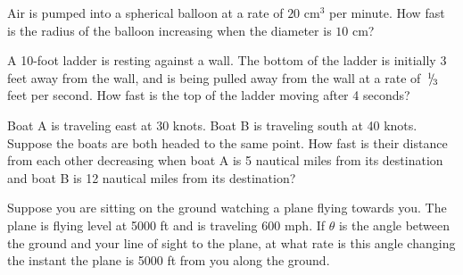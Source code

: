 \documentclass[unboxed]{hwset}
\date{29 March 2011}
\begin{document}
\begin{problem}[1.]
	Air is pumped into a spherical balloon at a rate of $20\text{ cm}^3$ per minute. How
	fast is the radius of the balloon increasing when the diameter is $10$ cm?
\end{problem}

\begin{problem}[2.]
	A 10-foot ladder is resting against a wall. The bottom of the ladder is
	initially 3 feet away from the wall, and is being pulled away from the wall at
	a rate of $\,^{1}\!\!/\!_{3}$ feet per second. How fast is the top of the ladder
	moving after 4 seconds?
\end{problem}

\begin{problem}[3.]
	Boat A is traveling east at 30 knots. Boat B is traveling south at 40 knots.
	Suppose the boats are both headed to the same point. How fast is their
	distance from each other decreasing when boat A is 5 nautical miles from its
	destination and boat B is 12 nautical miles from its destination?
\end{problem}

\begin{problem}[4.]
	Suppose you are sitting on the ground watching a plane flying towards you. The
	plane is flying level at 5000 ft and is traveling 600 mph. If $\theta$ is the
	angle between the ground and your line of sight to the plane, at what rate is
	this angle changing the instant the plane is 5000 ft from you along the
	ground.
\end{problem}
\end{document}
